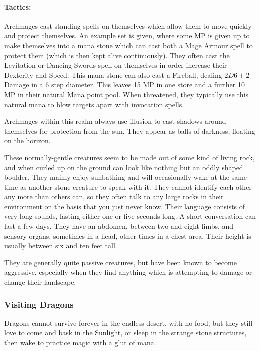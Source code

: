 \begin{multicols}{2}
\paragraph{Tactics:} Archmages cast standing spells on themselves which allow them to move quickly and protect themselves.
An example set is given, where some MP is given up to make themselves into a mana stone which can cast both a Mage Armour spell to protect them (which is then kept alive continuously).
They often cast the Levitation or Dancing Swords spell on themselves in order increase their Dexterity and Speed.
This mana stone can also cast a Fireball, dealing $2D6+2$ Damage in a 6 step diameter.
This leaves 15 MP in one store and a further 10 MP in their natural Mana point pool.
When threatened, they typically use this natural mana to blow targets apart with invocation spells.

Archmages within this realm always use illusion to cast shadows around themselves for protection from the sun.
They appear as balls of darkness, floating on the horizon.


\label{rockman}

These normally-gentle creatures seem to be made out of some kind of living rock, and when curled up on the ground can look like nothing but an oddly shaped boulder.
They mainly enjoy sunbathing and will occasionally wake at the same time as another stone creature to speak with it.
They cannot identify each other any more than others can, so they often talk to any large rocks in their environment on the basis that you just never know.
Their language consists of very long sounds, lasting either one or five seconds long.
A short conversation can last a few days.
They have an abdomen, between two and eight limbs, and sensory organs, sometimes in a head, other times in a chest area.
Their height is usually between six and ten feet tall.

They are generally quite passive creatures, but have been known to become aggressive, especially when they find anything which is attempting to damage or change their landscape.


\subsubsection{Visiting Dragons}

Dragons cannot survive forever in the endless desert, with no food, but they still love to come and bask in the Sunlight, or sleep in the strange stone structures, then wake to practice magic with a glut of mana.


\end{multicols}
